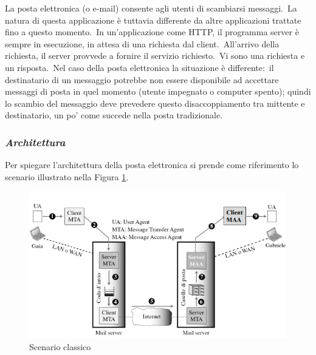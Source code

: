 La posta elettronica (o e-mail) consente agli utenti di scambiarsi messaggi.\
La natura di questa applicazione è tuttavia differente da altre applicazioni trattate fino a questo momento.\
In un'applicazione come HTTP, il programma server è sempre in esecuzione, in attesa di una richiesta dal client.\
All'arrivo della richiesta, il server provvede a fornire il servizio richiesto.\
Vi sono una richiesta e un risposta.\
Nel caso della posta elettronica la situazione è differente:\ il destinatario di un messaggio potrebbe non essere disponibile ad accettare messaggi di posta in quel momento (utente impegnato o computer spento); quindi lo scambio del messaggio deve prevedere questo disaccoppiamento tra mittente e destinatario, un po' come succede nella posta tradizionale.

\subsubsection{\emph{Architettura}}

Per spiegare l'architettura della posta elettronica si prende come riferimento lo scenario illustrato nella Figura \ref{fig:Mail}.

\begin{figure}[H]
    \centering
    \includegraphics[width=\textwidth]{immagini/Mail_Elettronica.png}
    \caption{Scenario classico}
    \label{fig:Mail}
\end{figure}

